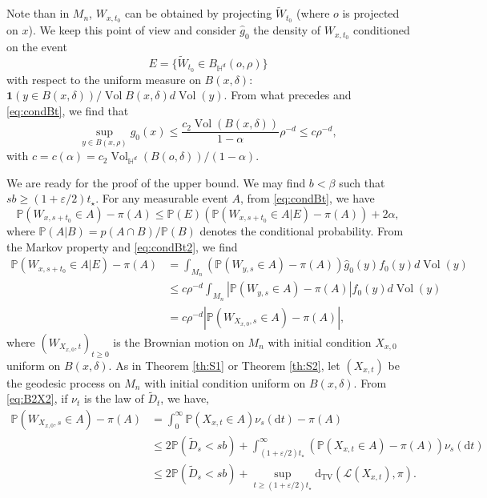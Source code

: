 \documentclass[]{scrartcl}
\newcommand{\DTV}{\mathrm{d_{TV}}}
\newcommand{\cL}{\mathcal L}
\newcommand{\dP}{\p}
\newcommand{\dH}{\mathds H}
\newcommand{\IND}{\mathbf{1}}
\newcommand{\p}{\mathbb{P}}
\newcommand{\eps}{\varepsilon}
\renewcommand{\d}{\mathrm{d}}
\DeclareMathOperator{\Vol}{Vol}
\numberwithin{equation}{section}
\numberwithin{figure}{section}
\begin{document}
Note than in $M_n$, $W_{x,t_0}$ can be obtained by projecting $\widetilde W_{t_0}$ (where $o$ is projected on $x$). We keep this point of view and consider $\hat g_0$ the density of $W_{x,t_0}$ conditioned on the event $$E = \{\widetilde W_{t_0}  \in B_{\dH^d} (o, \rho) \}$$ with respect to the uniform measure on $B(x,\delta)$: $\IND ( y \in B(x,\delta) ) / \Vol B(x,\delta) d \Vol(y)$. From what precedes and \eqref{eq:condBt}, we find that
\begin{equation}\label{eq:condBt2}
	\sup_{y \in B(x,\rho) } \hat g_0(x) \leq \frac{c_2 \Vol( B(x,\delta) )}{1 -\alpha} \rho^{-d} \leq c \rho^{-d},
\end{equation}
with $c = c(\alpha) = c_2 \Vol_{\mathds H^d} ( B(o,\delta) )  / (1-\alpha)$. 




We are ready for the proof of the upper bound. We may find $b < \beta$  such that $s b \geq (1 + \eps / 2) t_\star$. For any measurable event $A$, from \eqref{eq:condBt}, we have 
\begin{equation}\label{eq:bdAA}
	\p ( W_{x,s + t_0} \in A ) - \pi(A) \leq  \p(E) \left( \p ( W_{x,s+t_0} \in A | E )   - \pi(A) \right)   + 2 \alpha,
\end{equation}
where $\p( A | B) = p(A \cap B) / \p(B)$ denotes the conditional probability.   From the Markov property and \eqref{eq:condBt2}, we find
\begin{align*}
	\p ( W_{x,s+t_0} \in A | E )   - \pi(A) & =  \int_{M_n}  \left( \dP ( W_{y,s} \in A ) - \pi(A) \right) \hat g_0(y)  f_0(y) d \Vol (y) \\
	&\leq  c \rho^{-d}  \int_{M_n}   \left| \dP ( W_{y,s} \in A ) - \pi(A) \right| f_0(y) d \Vol (y) \\ 
	& = c \rho^{-d}     \left| \dP ( W_{X_{x,0},s} \in A ) - \pi(A) \right|,
\end{align*}
where $(W_{X_{x,0},t})_{t \geq 0}$ is the Brownian motion on $M_n$ with initial condition $X_{x,0}$ uniform on $B(x,\delta)$.  As in Theorem \ref{th:S1} or Theorem \ref{th:S2}, let $(X_{x,t})$ be the geodesic process on $M_n$ with initial condition uniform on $B(x,\delta)$. From \eqref{eq:B2X2}, if $\nu_t$ is the law of $\widetilde D_t$, we have, 
\begin{align*}
	\p ( W_{X_{x,0},s} \in A ) - \pi(A) & = \int_0 ^\infty \p ( X_{x,t} \in A) \nu_{s} (\d t) - \pi(A) \\
	&  \leq 2 \p (  \widetilde D_{s} <  s b ) + \int_{( 1+ \eps / 2 ) t_\star}^\infty (\p(X_{x,t} \in A) - \pi(A) ) \nu_{s} (\d t) \\
	&   \leq 2 \p (  \widetilde D_{s} <  s b ) + \sup_{t \geq ( 1+ \eps / 2 ) t_\star} \DTV( \cL (X_{x,t}),\pi). 
\end{align*}
\end{document}
